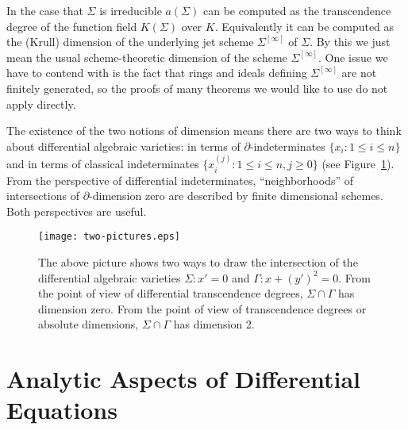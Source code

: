 \documentclass[12pt]{book}
\numberwithin{equation}{section}
\theoremstyle{definition}
\theoremstyle{remark}
\begin{document}
In the case that $\Sigma$ is irreducible $a(\Sigma)$ can be computed as the transcendence degree of the function field $K(\Sigma)$ over $K$.
Equivalently it can be computed as the (Krull) dimension of the underlying jet scheme $\Sigma^{[\infty]}$ of $\Sigma$.
By this we just mean the usual scheme-theoretic dimension of the scheme $\Sigma^{[\infty]}$. 
One issue we have to contend with is the fact that rings and ideals defining $\Sigma^{[\infty]}$ are not finitely generated, so the proofs of many theorems we would like to use do not apply directly.

The existence of the two notions of dimension means there are two ways to think about differential algebraic varieties: in terms of  $\partial$-indeterminates $\lbrace x_i \colon 1\leq i \leq n \rbrace$ and in terms of classical indeterminates $\lbrace x_i^{(j)} \colon 1\leq i \leq n, j\geq 0 \rbrace$ (see Figure~\ref{F:two-pictures}).
From the perspective of differential indeterminates, ``neighborhoods'' of intersections of $\partial$-dimension zero are described by finite dimensional schemes.
Both perspectives are useful.

\begin{figure}[h]
	\begin{center}
		\texttt{[image: two-pictures.eps]}
	\end{center}
	\caption{The above picture shows two ways to draw the intersection of the differential algebraic varieties $\Sigma \colon x'=0$ and $\Gamma \colon x+(y')^2=0$. 
		From the point of view of differential transcendence degrees, $\Sigma \cap \Gamma$ has dimension zero. 
		From the point of view of transcendence degrees or absolute dimensions, $\Sigma\cap \Gamma$ has dimension 2.
	}\label{F:two-pictures}
\end{figure}





\appendix 

\chapter[Analytic Aspects]{Analytic Aspects of Differential Equations}
\end{document}
